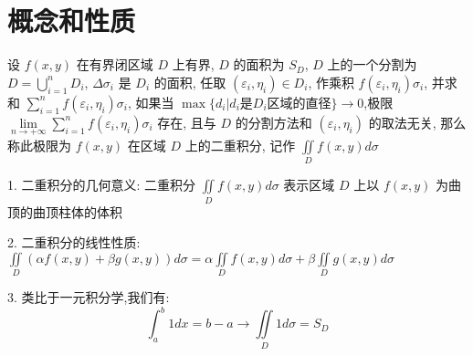 \section{概念和性质}
\begin{definition}[二重积分]
	设 $f(x,y)$ 在有界闭区域 $D$ 上有界, $D$ 的面积为 $S_{D}$, $D$ 上的一个分割为 $D=\bigcup\limits_{i=1}^{n}D_{i}$, $\Delta \sigma_{i}$ 是 $D_{i}$ 的面积, 任取 $(\varepsilon_{i},\eta_{i})\in D_{i}$, 作乘积 $f(\varepsilon_{i},\eta_{i})\sigma_{i}$,
并求和 $\sum\limits_{i=1}^{n}f(\varepsilon_{i},\eta_{i})\sigma_{i}$, 如果当 $\max\{d_{i}|d_{i}\text{是}D_{i}\text{区域的直径}\}\to 0$,极限 $\lim\limits_{n\to +\infty}\sum\limits_{i=1}^{n}f(\varepsilon_{i},\eta_{i})\sigma_{i}$ 存在, 且与 $D$ 的分割方法和 $(\varepsilon_{i},\eta_{i})$ 的取法无关, 
那么称此极限为 $f(x,y)$ 在区域 $D$ 上的二重积分, 记作 $\iint\limits_{D}f(x,y)d\sigma$
\end{definition}
\begin{definition}[性质]
	1. 二重积分的几何意义: 二重积分 $\iint\limits_{D}f(x,y)d\sigma$ 表示区域 $D$ 上以 $f(x,y)$ 为曲顶的曲顶柱体的体积

	2. 二重积分的线性性质: $\iint\limits_{D}(\alpha f(x,y)+\beta g(x,y))d\sigma=\alpha\iint\limits_{D}f(x,y)d\sigma+\beta\iint\limits_{D}g(x,y)d\sigma$
	
	3. 类比于一元积分学,我们有: $$\int_{a}^{b}1dx=b-a\to \iint\limits_{D}1d\sigma=S_{D}$$
\end{definition}
